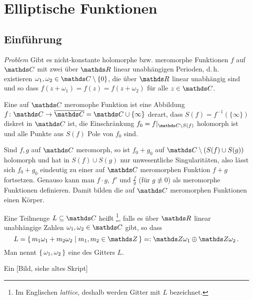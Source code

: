 \section{Elliptische Funktionen}

\subsection{Einführung}

\emph{Problem} Gibt es nicht-konstante holomorphe bzw. meromorphe Funktionen $f$ auf $\CC$ mit zwei über $\RR$ linear unabhängigen Perioden, d.\,h. existieren $\omega_1, \omega_2 \in \CC\setminus\{0\}$, die über $\RR$ linear unabhängig sind und so dass $f(z+\omega_1) = f(z) = f(z+\omega_2)$ für alle $z\in\CC$.

\begin{erin}
Eine auf $\CC$ meromophe Funktion ist eine Abbildung $f\colon \CC \ra \closure \CC = \CC \cup \{\infty\}$ derart, dass $S(f) = f^{-1}(\{\infty\})$ diskret in $\CC$ ist, die Einschränkung $f_0 = f|_{\CC\setminus S(f)}$ holomorph ist und alle Punkte aus $S(f)$ Pole von $f_0$ sind.

Sind $f, g$ auf $\CC$ meromorph, so ist $f_0 + g_0$ auf $\CC\setminus(S(f) \cup S(g))$ holomorph und hat in $S(f) \cup S(g)$ nur unwesentliche Singularitäten, also lässt sich $f_0 + g_0$ eindeutig zu einer auf $\CC$ meromorphen Funktion $f+g$ fortsetzen.
Genauso kann man $f\cdot g$, $f'$ und $\frac{f}{g}$ (für $g\not\equiv 0$) als meromorphe Funktionen definieren. Damit bilden die auf $\CC$ meromorphen Funktionen einen Körper.
\end{erin}

\begin{defi}
Eine Teilmenge $L \subseteq \CC$ heißt \footnote{Im Englischen \emph{lattice}, deshalb werden Gitter mit $L$ bezeichnet.}, falls es über $\RR$ linear unabhängige Zahlen $\omega_1, \omega_2\in\CC$ gibt, so dass
\[
	L = \Set{ m_1\omega_1 + m_2 \omega_2 \mid m_1, m_2 \in \ZZ}
	=: \ZZ\omega_1 \oplus \ZZ\omega_2
	\,.
\]
Man nennt $\left\{\,\omega_1, \omega_2\,\right\}$ eine  des Gitters $L$.
\end{defi}

\begin{bsp}
Ein [Bild, siehe altes Skript]
\end{bsp}

